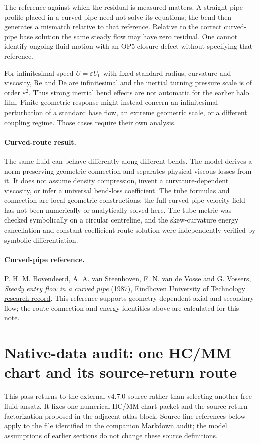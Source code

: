 \documentclass[11pt,a4paper]{article}
\begin{document}
The reference against which the residual is measured matters. A straight-pipe
profile placed in a curved pipe need not solve its equations; the bend then
generates a mismatch relative to that reference. Relative to the correct
curved-pipe base solution the same steady flow may have zero residual.
One cannot identify ongoing fluid motion with an OP5 closure defect without
specifying that reference.

For infinitesimal speed $U=\varepsilon U_0$ with fixed standard radius,
curvature and viscosity, $\mathrm{Re}$ and $\mathrm{De}$ are infinitesimal
and the inertial turning pressure scale is of order $\varepsilon^2$.
Thus strong inertial bend effects are not automatic for the earlier halo
film. Finite geometric response might instead concern an infinitesimal
perturbation of a standard base flow, an extreme geometric scale, or a
different coupling regime. Those cases require their own analysis.

\paragraph{Curved-route result.}
The same fluid can behave differently along different bends. The model
derives a norm-preserving geometric connection and separates physical
viscous losses from it. It does not assume density compression, invent a
curvature-dependent viscosity, or infer a universal bend-loss coefficient.
The tube formulas and connection are local geometric constructions; the
full curved-pipe velocity field has not been numerically or analytically
solved here.
The tube metric was checked symbolically on a circular centreline, and the
skew-curvature energy cancellation and constant-coefficient route solution
were independently verified by symbolic differentiation.

\paragraph{Curved-pipe reference.}
P. H. M. Bovendeerd, A. A. van Steenhoven, F. N. van de Vosse and G. Vossers,
\emph{Steady entry flow in a curved pipe} (1987),
\href{https://research.tue.nl/en/publications/steady-entry-flow-in-a-curved-pipe}{Eindhoven University of Technology research record}.
This reference supports geometry-dependent axial and secondary flow;
the route-connection and energy identities above are calculated for this note.

\section{Native-data audit: one HC/MM chart and its source-return route}
\label{sec:native-chart-audit}
This pass returns to the external v4.7.0 source rather than selecting another
free fluid ansatz. It fixes one numerical HC/MM chart packet and the
source-return factorization proposed in the adjacent atlas block. Source
line references below apply to the file identified in the companion
Markdown audit; the model assumptions of earlier sections do not change
these source definitions.
\end{document}
